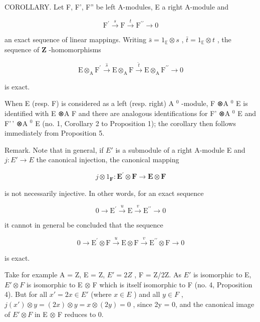 COROLLARY. Let F, F', F'' be left A-modules, E a right A-module and

\[
\mathrm{F} ^ {\prime} \stackrel {s} {\longrightarrow} \mathrm{F} \stackrel {t} {\longrightarrow} \mathrm{F} ^ {\prime \prime} \longrightarrow 0\tag{16}
\]

an exact sequence of linear mappings. Writing \(\bar{s} = 1_{\mathbb{E}} \otimes s\) , \(\bar{t} = 1_{\mathbb{E}} \otimes t\) , the sequence of \(\mathbf{Z}\) -homomorphisms

\[
\mathrm{E} \otimes_ {\mathrm{A}} \mathrm{F} ^ {\prime} \stackrel {\hat {s}} {\longrightarrow} \mathrm{E} \otimes_ {\mathrm{A}} \mathrm{F} \stackrel {\hat {t}} {\longrightarrow} \mathrm{E} \otimes_ {\mathrm{A}} \mathrm{F} ^ {\prime \prime} \longrightarrow 0\tag{17}
\]

is exact.

When E (resp. F) is considered as a left (resp. right) A \(^{0}\) -module, F ⊗A \(^{0}\) E is identified with E ⊗A F and there are analogous identifications for F' ⊗A \(^{0}\) E and F'\,' ⊗A \(^{0}\) E (no. 1, Corollary 2 to Proposition 1); the corollary then follows immediately from Proposition 5.

Remark. Note that in general, if \(E'\) is a submodule of a right A-module E and \(j:E'\to E\) the canonical injection, the canonical mapping

\[
j \otimes 1 _ {\mathbf {F}}: \mathbf {E} ^ {\prime} \otimes \mathbf {F} \rightarrow \mathbf {E} \otimes \mathbf {F}
\]

is not necessarily injective. In other words, for an exact sequence

\[
0 \longrightarrow \mathrm{E} ^ {\prime} \stackrel {u} {\longrightarrow} \mathrm{E} \stackrel {v} {\longrightarrow} \mathrm{E} ^ {\prime \prime} \longrightarrow 0\tag{18}
\]

it cannot in general be concluded that the sequence

\[
0 \longrightarrow \mathrm{E} ^ {\prime} \otimes \mathrm{F} \stackrel {u} {\longrightarrow} \mathrm{E} \otimes \mathrm{F} \stackrel {v} {\longrightarrow} \mathrm{E} ^ {\prime \prime} \otimes \mathrm{F} \longrightarrow 0\tag{19}
\]

is exact.

Take for example A = Z, E = Z, \(E' = 2Z\) , F = Z/2Z. As \(E'\) is isomorphic to E, \(E' \otimes F\) is isomorphic to E \(\otimes\) F which is itself isomorphic to F (no. 4, Proposition 4). But for all \(x' = 2x \in E'\) (where \(x \in E\) ) and all \(y \in F\) , \(j(x') \otimes y = (2x) \otimes y = x \otimes (2y) = 0\) , since 2y = 0, and the canonical image of \(E' \otimes F\) in E \(\otimes\) F reduces to 0.

